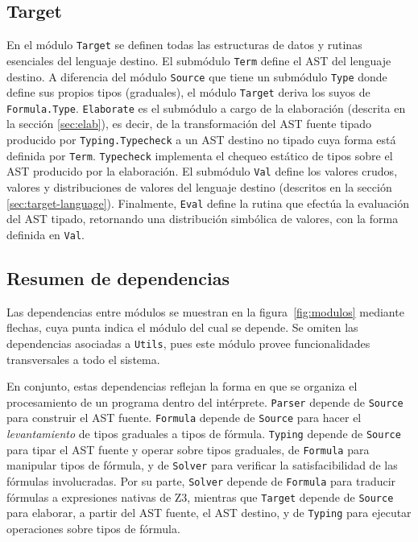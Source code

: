 \subsection{Target} En el módulo \verb|Target| se definen todas las
estructuras de datos y rutinas esenciales del lenguaje destino. El submódulo \verb|Term| define el AST del lenguaje destino. A diferencia
del módulo \verb|Source| que tiene un submódulo \verb|Type| donde define sus propios tipos (graduales), el módulo \verb|Target| deriva los suyos de \verb|Formula.Type|. \verb|Elaborate| es el submódulo a cargo de la elaboración (descrita en la sección \ref{sec:elab}), es decir, de la transformación del AST fuente tipado producido por \verb|Typing.Typecheck| a un AST destino no tipado cuya forma está definida por \verb|Term|. \verb|Typecheck| implementa el chequeo estático de tipos sobre el AST producido por la elaboración. El submódulo \verb|Val| define los valores crudos, valores y distribuciones de valores del lenguaje destino (descritos en la sección \ref{sec:target-language}). Finalmente, \verb|Eval| define la rutina que efectúa la evaluación del AST tipado, retornando una distribución simbólica de valores, con la forma definida en \verb|Val|.


\subsection{Resumen de dependencias}
Las dependencias entre módulos se muestran en la
figura~\ref{fig:modulos} mediante flechas, cuya punta indica el módulo
del cual se depende. Se omiten las dependencias asociadas a
\verb|Utils|, pues este módulo provee funcionalidades transversales a
todo el sistema.

En conjunto, estas dependencias reflejan la forma en que se organiza
el procesamiento de un programa dentro del intérprete. \verb|Parser|
depende de \verb|Source| para construir el AST fuente. \verb|Formula|
depende de \verb|Source| para hacer el \emph{levantamiento} de tipos
graduales a tipos de fórmula. \verb|Typing| depende de \verb|Source|
para tipar el AST fuente y operar sobre tipos graduales, de
\verb|Formula| para manipular tipos de fórmula, y de \verb|Solver|
para verificar la satisfacibilidad de las fórmulas involucradas. Por
su parte, \verb|Solver| depende de \verb|Formula| para traducir
fórmulas a expresiones nativas de Z3, mientras que \verb|Target|
depende de \verb|Source| para elaborar, a partir del AST fuente, el
AST destino, y de \verb|Typing| para ejecutar operaciones sobre tipos
de fórmula.




